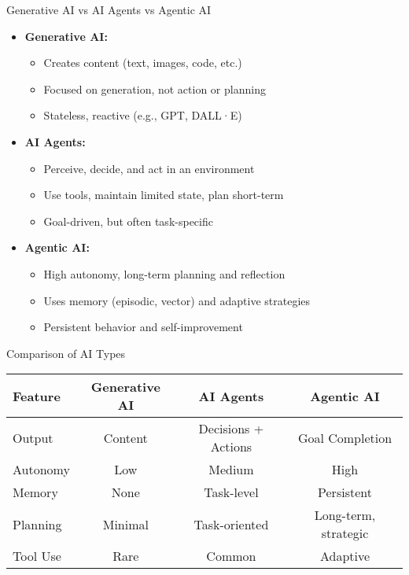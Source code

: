 \documentclass[8pt]{beamer}
\begin{document}
\begin{frame}{Generative AI vs AI Agents vs Agentic AI}

\begin{itemize}
    \item \textbf{Generative AI:}
    \begin{itemize}
        \item Creates content (text, images, code, etc.)
        \item Focused on generation, not action or planning
        \item Stateless, reactive (e.g., GPT, DALL·E)
    \end{itemize}

    \vspace{0.3cm}
    \item \textbf{AI Agents:}
    \begin{itemize}
        \item Perceive, decide, and act in an environment
        \item Use tools, maintain limited state, plan short-term
        \item Goal-driven, but often task-specific
    \end{itemize}

    \vspace{0.3cm}
    \item \textbf{Agentic AI:}
    \begin{itemize}
        \item High autonomy, long-term planning and reflection
        \item Uses memory (episodic, vector) and adaptive strategies
        \item Persistent behavior and self-improvement
    \end{itemize}
\end{itemize}

\end{frame}

\begin{frame}{Comparison of AI Types}

\begin{tabular}{|l|c|c|c|}
\hline
\textbf{Feature} & \textbf{Generative AI} & \textbf{AI Agents} & \textbf{Agentic AI} \\
\hline
Output & Content & Decisions + Actions & Goal Completion \\
\hline
Autonomy & Low & Medium & High \\
\hline
Memory & None & Task-level & Persistent \\
\hline
Planning & Minimal & Task-oriented & Long-term, strategic \\
\hline
Tool Use & Rare & Common & Adaptive \\
\hline
\end{tabular}

\end{frame}
\end{document}
